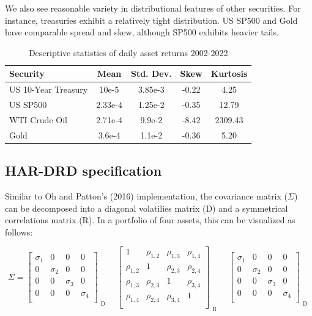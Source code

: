 \documentclass{article}
\begin{document}
We also see reasonable variety in distributional features of other securities. For instance, treasuries exhibit a relatively tight
distribution. US SP500 and Gold have comparable spread and skew, although SP500 exhibits heavier tails.
\begin{table}[ht]
    \centering
    \caption{Descriptive statistics of daily asset returns 2002-2022}
    \begin{tabular}{lcccc}
    \toprule
    \textbf{Security} & \textbf{Mean} & \textbf{Std. Dev.} & \textbf{Skew} & \textbf{Kurtosis} \\
    \midrule
    US 10-Year Treasury & 10e-5 & 3.85e-3 & -0.22 & 4.25 \\
    US SP500 & 2.33e-4 & 1.25e-2 & -0.35 & 12.79 \\
    WTI Crude Oil & 2.71e-4 & 9.9e-2 & -8.42 & 2309.43 \\
    Gold & 3.6e-4 & 1.1e-2 & -0.36 & 5.20 \\
    \bottomrule
    \end{tabular}
    \label{tab:descriptive_stats}
    \end{table}


\subsection{HAR-DRD specification}

Similar to Oh and Patton's (2016) implementation, the covariance matrix ($\Sigma$) can be 
decomposed into a diagonal volatilies matrix (D) and a symmetrical correlations matrix (R).
In a portfolio of four assets, this can be visualized as follows:

\begin{equation*}
    \Sigma =
    \begin{bmatrix}
        \sigma_1 & 0 & 0 & 0 \\
        0 & \sigma_2 & 0 & 0 \\
        0 & 0 & \sigma_3 & 0 \\
        0 & 0 & 0 & \sigma_4 \\
    \end{bmatrix} 
    _{\substack{\text{D}}}
    \quad
    \begin{bmatrix}
        1 & \rho_{1,2} & \rho_{1,3} & \rho_{1,4} \\
        \rho_{1,2} & 1 & \rho_{2,3} & \rho_{2,4} \\
        \rho_{1,3} & \rho_{2,3} & 1 & \rho_{3,4} \\
        \rho_{1,4} & \rho_{2,4} & \rho_{3,4} & 1 \\
    \end{bmatrix}
    _{\substack{\text{R}}}
    \quad
    \begin{bmatrix}
        \sigma_1 & 0 & 0 & 0 \\
        0 & \sigma_2 & 0 & 0 \\
        0 & 0 & \sigma_3 & 0 \\
        0 & 0 & 0 & \sigma_4 \\
    \end{bmatrix}
    _{\substack{\text{D}}}
\end{equation*}
\end{document}
